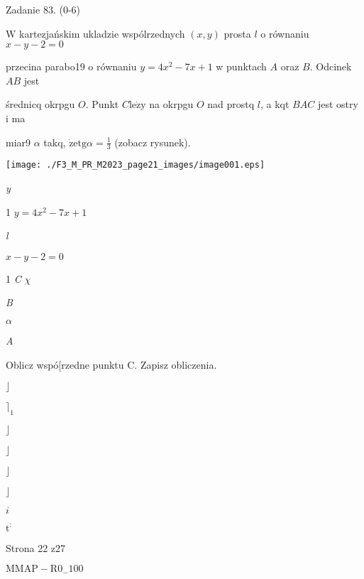 \documentclass[a4paper,12pt]{article}
\begin{document}
Zadanie 83. (0-6)

$\mathrm{W}$ kartezjańskim ukladzie wspólrzednych $(x,y)$ prosta $l$ o równaniu $x-y-2=0$

przecina parabo19 o równaniu $y=4x^{2}-7x+1$ w punktach $A$ oraz $B$. Odcinek $AB$ jest

średnicq okrpgu $O$. Punkt $C \mathrm{l}\mathrm{e}\dot{\mathrm{z}}\mathrm{y}$ na okrpgu $O$ nad prostq $l$, a kqt $BAC$ jest ostry i ma

miar9 $\alpha$ takq, $\dot{\mathrm{z}}\mathrm{e} \displaystyle \mathrm{t}\mathrm{g}\alpha=\frac{1}{3}$ (zobacz rysunek).
\begin{center}
\texttt{[image: ./F3\_M\_PR\_M2023\_page21\_images/image001.eps]}
\end{center}
{\it y}

1  $y=4x^{2}-7x+1$

{\it l}

$x-y-2=0$

1 {\it C}  $\chi$

{\it B}

$\alpha$

{\it A}

Oblicz wspó[rzedne punktu C. Zapisz obliczenia.

$\rfloor$

$\rceil_{1}$

$\rfloor$

$\rfloor$

$\rfloor$

$\rfloor$

$i$

$\mathrm{t}^{:}$

Strona 22 z27

$\mathrm{M}\mathrm{M}\mathrm{A}\mathrm{P}-\mathrm{R}0_{-}100$
\end{document}
